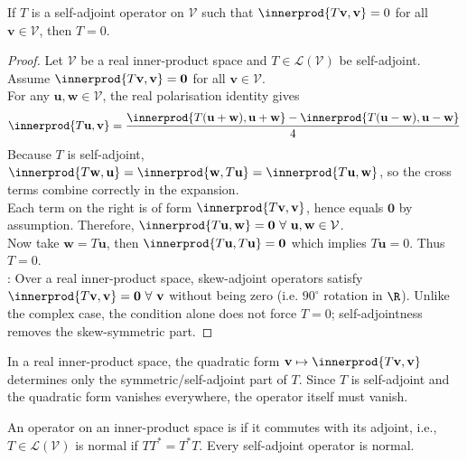 \begin{proposition} \label{prop:selfadjointopt0} If $T$ is a self-adjoint operator on $\mathcal{V}$ such that $\innerprod{T \mathbf{v}, \mathbf{v}} = 0$ for all $\mathbf{v} \in \mathcal{V}$, then $T = 0$.
\begin{proof} Let $\mathcal{V}$ be a real inner-product space and $T \in \mathcal{L}(\mathcal{V})$ be self-adjoint. Assume $\innerprod{T \mathbf{v}, \mathbf{v}} = \mathbf{0}$ for all $\mathbf{v} \in \mathcal{V}$.\\
For any $\mathbf{u}, \mathbf{w} \in \mathcal{V}$, the real polarisation identity gives
\begin{align}
\innerprod{T \mathbf{u}, \mathbf{v}} = \frac{\innerprod{T(\mathbf{u} + \mathbf{w}), \mathbf{u} + \mathbf{w}} - \innerprod{T(\mathbf{u} - \mathbf{w}), \mathbf{u} - \mathbf{w}}}{4} \nonumber
\end{align}
Because $T$ is self-adjoint, $\innerprod{T \mathbf{w}, \mathbf{u}} = \innerprod{\mathbf{w}, T \mathbf{u}} = \innerprod{T \mathbf{u}, \mathbf{w}}$, so the cross terms combine correctly in the expansion.\\
Each term on the right is of form $\innerprod{T \mathbf{v}, \mathbf{v}}$, hence equals $\mathbf{0}$ by assumption. Therefore, $\innerprod{T \mathbf{u}, \mathbf{w}} = \mathbf{0} \ \forall \ \mathbf{u}, \mathbf{w} \in \mathcal{V}$.\\
Now take $\mathbf{w} = T \mathbf{u}$, then $\innerprod{T \mathbf{u}, T \mathbf{u}} = \mathbf{0}$ which implies $T \mathbf{u} = 0$. Thus $T = 0$.\\
: Over a real inner-product space, skew-adjoint operators satisfy $\innerprod{T \mathbf{v}, \mathbf{v}} = \mathbf{0} \ \forall \ \mathbf{v}$ without being zero (i.e. $90^{\circ}$ rotation in $\R$). Unlike the complex case, the condition alone does not force $T=0$; self-adjointness removes the skew-symmetric part.
\end{proof}
\end{proposition}

In a real inner-product space, the quadratic form $\mathbf{v} \mapsto \innerprod{T \mathbf{v}, \mathbf{v}}$ determines only the symmetric/self-adjoint part of $T$. Since $T$ is self-adjoint and the quadratic form vanishes everywhere, the operator itself must vanish.

\begin{definition} An operator on an inner-product space is  if it commutes with its adjoint, i.e., $T \in \mathcal{L}(\mathcal{V})$ is normal if $T T^* = T^* T$. Every self-adjoint operator is normal.
\end{definition}

